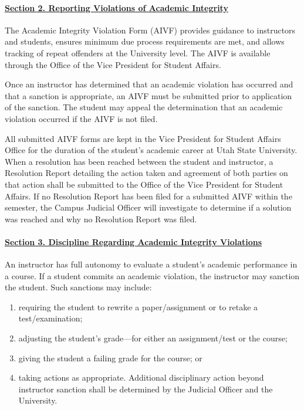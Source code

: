 \documentclass[10pt,fleqn]{article}
\begin{document}
\paragraph{\underline{Section 2. Reporting Violations of Academic Integrity}}
The Academic Integrity Violation Form (AIVF) provides guidance to instructors
and students, ensures minimum due process requirements are met, and allows
tracking of repeat offenders at the University level. The AIVF is available
through the Office of the Vice President for Student Affairs.

Once an instructor has determined that an academic violation has occurred and
that a sanction is appropriate, an AIVF must be submitted prior to application
of the sanction. The student may appeal the determination that an academic
violation occurred if the AIVF is not filed.

All submitted AIVF forms are kept in the Vice President for Student Affairs
Office for the duration of the student's academic career at Utah State
University. When a resolution has been reached between the student and
instructor, a Resolution Report detailing the action taken and agreement of
both parties on that action shall be submitted to the Office of the Vice
President for Student Affairs. If no Resolution Report has been filed for a
submitted AIVF within the semester, the Campus Judicial Officer will investigate
to determine if a solution was reached and why no Resolution Report was filed.

\paragraph{\underline{Section 3. Discipline Regarding Academic Integrity
Violations}} An instructor has full autonomy to evaluate a student's academic
performance in a course. If a student commits an academic violation, the
instructor may sanction the student. Such sanctions may include:
\begin{enumerate}
  \item requiring the student to rewrite a paper/assignment or to retake a
        test/examination;
  \item adjusting the student's grade—for either an assignment/test or the
        course;
  \item giving the student a failing grade for the course; or
  \item taking actions as appropriate. Additional disciplinary action beyond
        instructor sanction shall be determined by the Judicial Officer and the
        University.
\end{enumerate}
\end{document}
